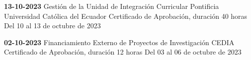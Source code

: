 \begin{levent}
    \cvevent
	{\textbf{13-10-2023}}
	{Gestión de la Unidad de Integración Curricular}
	{Pontificia Universidad Católica del Ecuador}
	{Certificado de Aprobación, duración 40 horas}
	{Del 10 al 13 de octubre de 2023}
\end{levent}

\begin{devent}
    \cvevent
	{\textbf{02-10-2023}}
	{Financiamiento Externo de Proyectos de Investigación}
	{CEDIA}
	{Certificado de Aprobación, duración 12 horas}
	{Del 03 al 06 de octubre de 2023}
\end{devent}